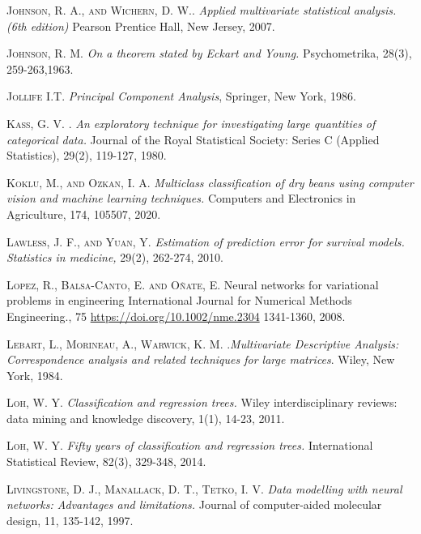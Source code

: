 \begin{thebibliography}{99}
\textsc{Johnson, R. A., and Wichern, D. W.}. \emph{Applied multivariate statistical analysis.(6th edition)} Pearson Prentice Hall, New Jersey, 2007.

 \textsc{Johnson, R. M. } \emph{On a theorem stated by Eckart and Young.} Psychometrika, 28(3), 259-263,1963.

 \textsc{Jollife I.T}. \emph{Principal Component Analysis}, Springer, New York, 1986.



\textsc{Kass, G. V. }. \emph{An exploratory technique for investigating large quantities of categorical data.} Journal of the Royal Statistical Society: Series C (Applied Statistics), 29(2), 119-127, 1980.


\textsc{Koklu, M., and Ozkan, I. A.} \emph{Multiclass classification of dry beans using computer vision and machine learning techniques.} Computers and Electronics in Agriculture, 174, 105507, 2020.

 \textsc{Lawless, J. F., and Yuan, Y.} \emph{Estimation of prediction error for survival models.} \emph{Statistics in medicine,} 29(2), 262-274, 2010.

 \textsc{Lopez, R., Balsa-Canto, E. and Oñate, E. }  Neural networks for variational problems in engineering International Journal for Numerical Methods Engineering., 75 \url{https://doi.org/10.1002/nme.2304} 1341-1360, 2008.

\textsc{Lebart, L., Morineau, A.,  Warwick, K. M. }.\textit{Multivariate Descriptive Analysis: Correspondence analysis and related techniques for large matrices}. Wiley, New York, 1984.

\textsc{Loh, W. Y. } \emph{Classification and regression trees.} Wiley interdisciplinary reviews: data mining and knowledge discovery, 1(1), 14-23, 2011.

\textsc{Loh, W. Y. } \emph{Fifty years of classification and regression trees.} International Statistical Review, 82(3), 329-348, 2014.

\textsc{Livingstone, D. J., Manallack, D. T., Tetko, I. V. } \emph{Data modelling with neural networks: Advantages and limitations.} Journal of computer-aided molecular design, 11, 135-142, 1997.


\end{thebibliography}
